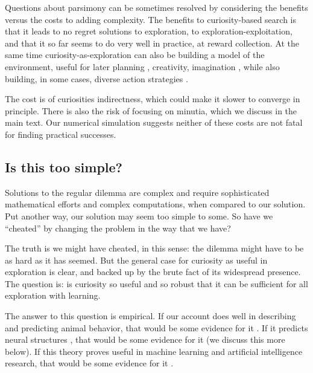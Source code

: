 Questions about parsimony can be sometimes resolved by considering the benefits versus the costs to adding complexity. The benefits to curiosity-based search is that it leads to no regret solutions to exploration, to exploration-exploitation, and that it so far seems to do very well in practice, at reward collection. At the same time curiosity-as-exploration can also be building a model of the environment, useful for later planning \cite{Ahilan2019,Poucet1993}, creativity, imagination \cite{Schmidhuber2010}, while also building, in some cases, diverse action strategies \cite{Lehman2011a,Lehman2013,Mouret2015,Colas2020}. 

The cost is of curiosities indirectness, which could make it slower to converge in principle. There is also the risk of focusing on minutia, which we discuss in the main text. Our numerical simulation suggests neither of these costs are not fatal for finding practical successes.


\subsection*{Is this too simple?}
Solutions to the regular dilemma are complex and require sophisticated mathematical efforts and complex computations, when compared to our solution. Put another way, our solution may seem too simple to some. So have we ``cheated'' by changing the problem in the way that we have?

The truth is we might have cheated, in this sense: the dilemma might have to be as hard as it has seemed. But the general case for curiosity as useful in exploration is clear, and backed up by the brute fact of its widespread presence. The question is: is curiosity so useful and so robust that it can be sufficient for all exploration with learning. 

The answer to this question is empirical. If our account does well in describing and predicting animal behavior, that would be some evidence for it \cite{Sumner2019,Wang2019,Jaegle2019,Gottlieb2018,Kidd2015,Berlyne1950,Colas2020a,Rahnev2018,Wilson2020,CogliatiDezza2017b,Berger-Tal2014}. If it predicts neural structures \cite{Cisek2019,Kobayashi2019}, that would be some evidence for it (we discuss this more below). If this theory proves useful in machine learning and artificial intelligence research, that would be some evidence for it \cite{Burda2018,Schmidhuber1991,deAbril2018,Fister2019,Lehman2011a,Stanley2004a,Colas2020,Cully2015,Wilson2020,Pathak2019}. 


